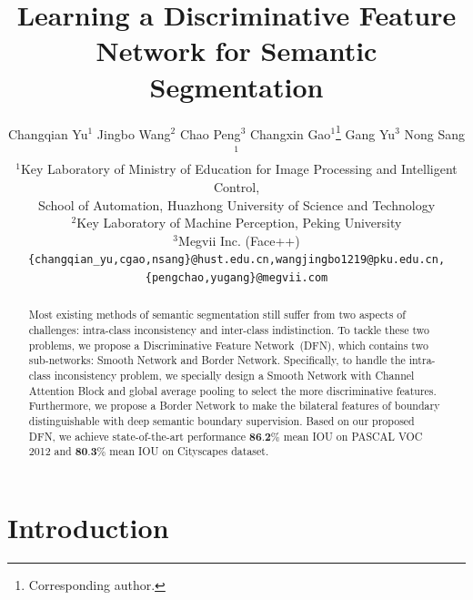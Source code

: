 \documentclass[10pt,twocolumn,letterpaper]{article}
\begin{document}
\title{Learning a Discriminative Feature Network for Semantic Segmentation}

\author{
    Changqian Yu$^1$
    \hspace{10pt}
    Jingbo Wang$^2$
    \hspace{10pt}
    Chao Peng$^3$
    \hspace{10pt}
    Changxin Gao$^1$\thanks{Corresponding author.}
    \hspace{10pt}
    Gang Yu$^3$
    \hspace{10pt}
    Nong Sang$^1$\\
    $^1$Key Laboratory of Ministry of Education for Image Processing and Intelligent Control,\\School of Automation, Huazhong University of Science and Technology\\
    $^2$Key Laboratory of Machine Perception, Peking University\\
    $^3$Megvii Inc. (Face++)\\
{\tt\small \{changqian\_yu,cgao,nsang\}@hust.edu.cn,wangjingbo1219@pku.edu.cn,\{pengchao,yugang\}@megvii.com}
}

\maketitle
\begin{abstract}
   Most existing methods of semantic segmentation still suffer from two aspects of challenges: intra-class inconsistency and inter-class indistinction. To tackle these two problems, we propose a Discriminative Feature Network~(DFN), which contains two sub-networks: Smooth Network and Border Network. Specifically, to handle the intra-class inconsistency problem, we specially design a Smooth Network with Channel Attention Block and global average pooling to select the more discriminative features. Furthermore, we propose a Border Network to make the bilateral features of boundary distinguishable with deep semantic boundary supervision. Based on our proposed DFN, we achieve state-of-the-art performance $\textbf{86.2\%}$ mean IOU on PASCAL VOC 2012 and $\textbf{80.3\%}$ mean IOU on Cityscapes dataset.
\end{abstract}

\section{Introduction}
\label{sec:introduction}
\end{document}

